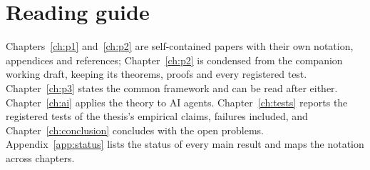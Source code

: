 \section{Reading guide}

Chapters~\ref{ch:p1} and~\ref{ch:p2} are self-contained papers with their own notation, appendices and references; Chapter~\ref{ch:p2} is condensed from the companion working draft, keeping its theorems, proofs and every registered test. Chapter~\ref{ch:p3} states the common framework and can be read after either. Chapter~\ref{ch:ai} applies the theory to AI agents. Chapter~\ref{ch:tests} reports the registered tests of the thesis's empirical claims, failures included, and Chapter~\ref{ch:conclusion} concludes with the open problems. Appendix~\ref{app:status} lists the status of every main result and maps the notation across chapters.
